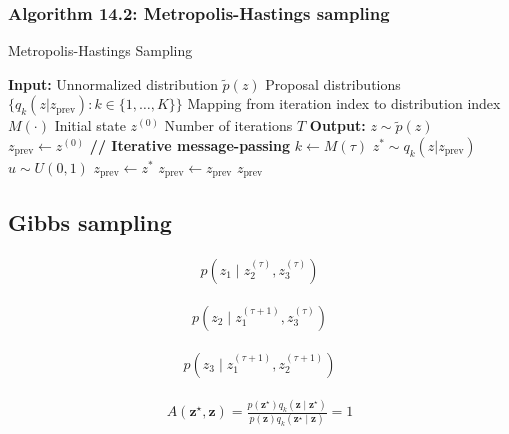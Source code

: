 \documentclass{article}
\begin{document}
\subsubsection{Algorithm 14.2: Metropolis-Hastings sampling}

\begin{algorithm}[H]
\caption{Metropolis-Hastings Sampling}
\begin{algorithmic}[1]
\STATE \textbf{Input:} Unnormalized distribution $\tilde{p}(z)$
\STATE \quad Proposal distributions $\{q_k(z | z_{\text{prev}}) : k \in \{1, \ldots, K\}\}$
\STATE \quad Mapping from iteration index to distribution index $M(\cdot)$
\STATE \quad Initial state $z^{(0)}$
\STATE \quad Number of iterations $T$
\STATE \textbf{Output:} $z \sim \tilde{p}(z)$
\STATE $z_{\text{prev}} \gets z^{(0)}$
\STATE \textbf{// Iterative message-passing}
    \STATE $k \gets M(\tau)$ 
    \STATE $z^* \sim q_k(z | z_{\text{prev}})$ 
    \STATE $u \sim U(0, 1)$ 
        \STATE $z_{\text{prev}} \gets z^*$ 
    \ELSE
        \STATE $z_{\text{prev}} \gets z_{\text{prev}}$ 
    \ENDIF
\ENDFOR
\RETURN $z_{\text{prev}}$ 
\end{algorithmic}
\end{algorithm}

\subsection{Gibbs sampling}

\begin{align*}
p\left(z_{1} \mid z_{2}^{(\tau)}, z_{3}^{(\tau)}\right) \tag{14.42}
\end{align*}

\begin{align*}
p\left(z_{2} \mid z_{1}^{(\tau+1)}, z_{3}^{(\tau)}\right) \tag{14.43}
\end{align*}

\begin{align*}
p\left(z_{3} \mid z_{1}^{(\tau+1)}, z_{2}^{(\tau+1)}\right) \tag{14.44}
\end{align*}

\begin{align*}
A\left(\mathbf{z}^{\star}, \mathbf{z}\right)=\frac{p\left(\mathbf{z}^{\star}\right) q_{k}\left(\mathbf{z} \mid \mathbf{z}^{\star}\right)}{p(\mathbf{z}) q_{k}\left(\mathbf{z}^{\star} \mid \mathbf{z}\right)}=1 \tag{14.45}
\end{align*}
\end{document}
